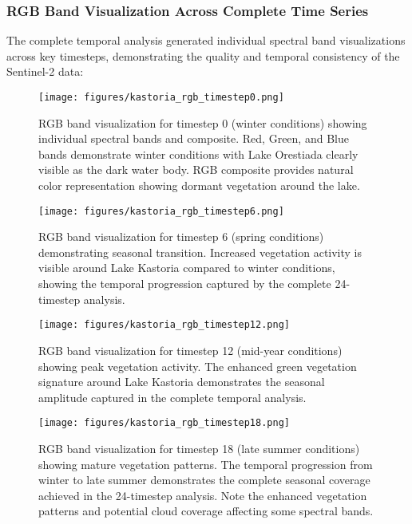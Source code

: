 \documentclass[a4paper,12pt]{article}
\begin{document}
\subsubsection{RGB Band Visualization Across Complete Time Series}

The complete temporal analysis generated individual spectral band visualizations across key timesteps, demonstrating the quality and temporal consistency of the Sentinel-2 data:

\begin{figure}[H]
    \centering
    \texttt{[image: figures/kastoria\_rgb\_timestep0.png]}
    \caption{RGB band visualization for timestep 0 (winter conditions) showing individual spectral bands and composite. Red, Green, and Blue bands demonstrate winter conditions with Lake Orestiada clearly visible as the dark water body. RGB composite provides natural color representation showing dormant vegetation around the lake.}
    \label{fig:rgb_t0}
\end{figure}

\begin{figure}[H]
    \centering
    \texttt{[image: figures/kastoria\_rgb\_timestep6.png]}
    \caption{RGB band visualization for timestep 6 (spring conditions) demonstrating seasonal transition. Increased vegetation activity is visible around Lake Kastoria compared to winter conditions, showing the temporal progression captured by the complete 24-timestep analysis.}
    \label{fig:rgb_t6}
\end{figure}

\begin{figure}[H]
    \centering
    \texttt{[image: figures/kastoria\_rgb\_timestep12.png]}
    \caption{RGB band visualization for timestep 12 (mid-year conditions) showing peak vegetation activity. The enhanced green vegetation signature around Lake Kastoria demonstrates the seasonal amplitude captured in the complete temporal analysis.}
    \label{fig:rgb_t12}
\end{figure}

\begin{figure}[H]
    \centering
    \texttt{[image: figures/kastoria\_rgb\_timestep18.png]}
    \caption{RGB band visualization for timestep 18 (late summer conditions) showing mature vegetation patterns. The temporal progression from winter to late summer demonstrates the complete seasonal coverage achieved in the 24-timestep analysis. Note the enhanced vegetation patterns and potential cloud coverage affecting some spectral bands.}
    \label{fig:rgb_t18}
\end{figure}
\end{document}
